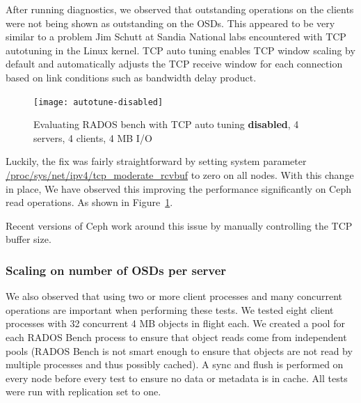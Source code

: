 After running diagnostics, we observed that outstanding operations on the
clients were not being shown as outstanding on the OSDs.  This appeared to be
very similar to a problem Jim Schutt at Sandia National labs encountered with
TCP autotuning in the Linux
kernel\cite{Jim:tcptune}.
TCP auto tuning enables TCP window scaling by default and automatically adjusts
the TCP receive window for each connection based on link conditions such as
bandwidth delay product. 

\begin{figure}[htb]
\centering
\texttt{[image: autotune-disabled]}
\caption{Evaluating RADOS bench with TCP auto tuning \textbf{disabled},  4 servers, 4
clients, 4 MB I/O}
\label{fig:rados-tcp-autotune-disabled}
\end{figure}


Luckily, the fix was fairly straightforward by setting system parameter
\url{/proc/sys/net/ipv4/tcp_moderate_rcvbuf} to zero on all nodes.  With this
change in place, We have observed this improving the performance significantly
on Ceph read operations. As shown in
Figure~\ref{fig:rados-tcp-autotune-disabled}.

Recent versions of Ceph work around this issue by manually controlling the TCP
buffer size.  

\subsubsection{Scaling on number of OSDs per server}

We also observed that using two or more client processes and many concurrent
operations are important when performing these tests.  We tested eight client
processes with 32 concurrent 4 MB objects in flight each. We created a pool
for each RADOS Bench process to ensure that object reads come from independent
pools (RADOS Bench is not smart enough to ensure that objects are not read by
multiple processes and thus possibly cached).  A sync and flush is performed
on every node before every test to ensure no data or metadata is in cache.
All tests were run with replication set to one. 


